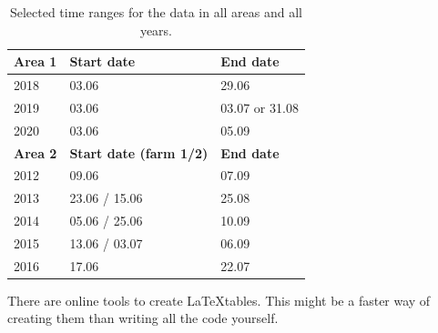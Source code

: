 \begin{table}[ht!]
\centering
    \begin{tabular}{ m{3cm} m{5cm} m{3cm} } 
    \toprule
    \toprule
    \textbf{Area 1} & \textbf{Start date} & \textbf{End date} \\
    \midrule
    2018    & 03.06    & 29.06                       \\[1.3ex]
    2019    & 03.06    & 03.07 or 31.08\footnotemark \\[1.3ex]
    2020    & 03.06    & 05.09                       \\[1.3ex]
    \midrule
    \textbf{Area 2} & \textbf{Start date (farm 1/2)} & \textbf{End date} \\
    \midrule
    2012    & 09.06            & 07.09               \\[1.3ex]
    2013    & 23.06 / 15.06    & 25.08               \\[1.3ex]
    2014    & 05.06 / 25.06    & 10.09               \\[1.3ex]
    2015    & 13.06 / 03.07    & 06.09               \\[1.3ex]
    2016    & 17.06            & 22.07               \\[1.3ex]
    \bottomrule
    \bottomrule
    \end{tabular}
\caption[Selected time ranges for all data]{Selected time ranges for the data in all areas and all years.}
\label{table:time_ranges}
\end{table}

There are online tools to create \LaTeX tables. This might be a faster way of creating them than writing all the code yourself.

